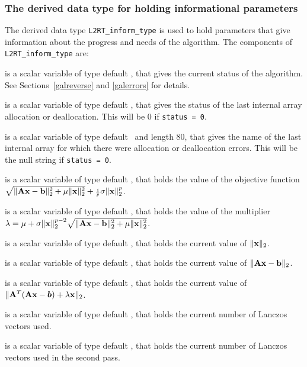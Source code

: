 \documentclass{galahad}
\newcommand{\packagename}{L2\-RT}
\begin{document}

\subsubsection{The derived data type for holding informational
 parameters}\label{typeinform}
The derived data type 
{\tt \packagename\_inform\_type} 
is used to hold parameters that give information about the progress and needs 
of the algorithm. The components of
{\tt \packagename\_inform\_type} 
are:

\begin{description}
 is a scalar variable of type default \integer, that gives the 
current status of the algorithm. See Sections~\ref{galreverse} and 
\ref{galerrors} for details. 

 is a scalar variable of type default \integer, 
that gives the status of the last internal array allocation 
or deallocation. This will be 0 if {\tt status = 0}.

 is a scalar variable of type default \character\
and length 80, that  gives the name of the last internal array 
for which there were allocation or deallocation errors.
This will be the null string if {\tt status = 0}. 

 is a scalar variable of type default 
\realdp, that holds the value of the objective function
$\sqrt{\| {\mathbf{A}} {\mathbf{x}} - {\mathbf{b}}\|_2^2 + \mu \| {\mathbf{x}} \|_2^2}
 + {\scriptstyle \frac{1}{p}} \sigma \| {\mathbf{x}} \|_2^p$.
 
 is a scalar variable of type default 
\realdp, that holds the value of the multiplier 
$\lambda = \mu + \sigma \|{\mathbf{x}}\|_2^{p-2} 
 \sqrt{\| {\mathbf{A}} {\mathbf{x}} - {\mathbf{b}} \|_2^2 + \mu \|{\mathbf{x}}\|_2^2}$.
 
 is a scalar variable of type default \realdp, 
that holds the current value of $\|{\mathbf{x}}\|_2$.
 
 is a scalar variable of type default \realdp, 
that holds the current value of 
$\| {\mathbf{A}} {\mathbf{x}} - {\mathbf{b}} \|_2$.
 
 is a scalar variable of type default \realdp, 
that holds the current value of 
$\|{\mathbf{A}}^T ( {\mathbf{A}} {\mathbf{x}} - \bm b ) + \lambda {\mathbf{x}} \|_2$.
 
 is a scalar variable of type default \integer, that holds the 
current number of Lanczos vectors used. 
 
 is a scalar variable of type default \integer, that holds the 
current number of Lanczos vectors used in the second pass. 
 
\end{description}
\end{document}
